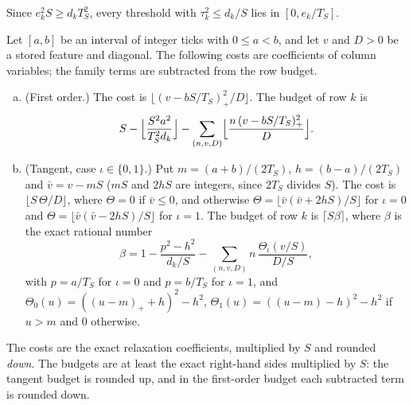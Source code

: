 Since $e_k^2S\ge d_kT_S^2$, every threshold with $\tau_k^2\le d_k/S$ lies in
$[0,e_k/T_S]$.

\begin{definition}\label{def:costs}
Let $[a,b]$ be an interval of integer ticks with $0\le a<b$, and let $v$ and $D>0$
be a stored feature and diagonal. The following costs are coefficients of column
variables; the family terms are subtracted from the row budget.
\begin{enumerate}[(a)]
  \item (First order.) The cost is $\lfloor(v-bS/T_S)_+^2/D\rfloor$. The budget of row $k$ is
    \[
      S-\Bigl\lfloor\frac{S^2a^2}{T_S^2d_k}\Bigr\rfloor-\sum_{(n,v,D)}\Bigl\lfloor\frac{n\,(v-bS/T_S)_+^2}{D}\Bigr\rfloor .
    \]
  \item (Tangent, case $\iota\in\{0,1\}$.) Put $m=(a+b)/(2T_S)$, $h=(b-a)/(2T_S)$ and $\bar v=v-mS$
    ($mS$ and $2hS$ are integers, since $2T_S$ divides $S$).
    The cost is $\lfloor S\,\Theta/D\rfloor$, where $\Theta=0$ if $\bar v\le0$, and otherwise
    $\Theta=\lfloor\bar v(\bar v+2hS)/S\rfloor$ for $\iota=0$ and $\Theta=\lfloor\bar v(\bar v-2hS)/S\rfloor$ for $\iota=1$. The
    budget of row $k$ is $\lceil S\beta\rceil$, where $\beta$ is the exact rational number
    \[
      \beta=1-\frac{p^2-h^2}{d_k/S}-\sum_{(n,v,D)}n\,\frac{\Theta_\iota(v/S)}{D/S},
    \]
    with $p=a/T_S$ for $\iota=0$ and $p=b/T_S$ for $\iota=1$, and $\Theta_0(u)=((u-m)_++h)^2-h^2$,
    $\Theta_1(u)=((u-m)-h)^2-h^2$ if $u>m$ and $0$ otherwise.
\end{enumerate}
\end{definition}

The costs are the exact relaxation coefficients, multiplied by $S$ and rounded \emph{down}. The
budgets are at least the exact right-hand sides multiplied by $S$: the tangent budget is rounded up,
and in the first-order budget each subtracted term is rounded down.

